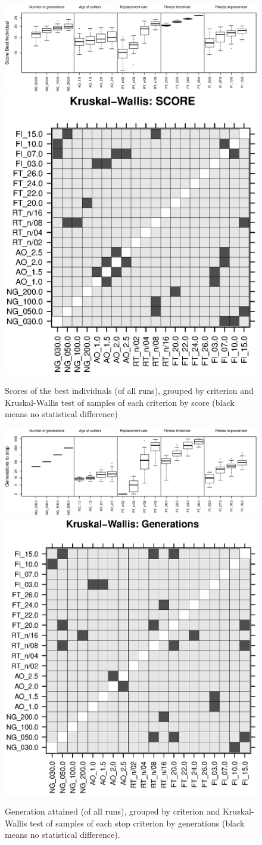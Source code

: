 \documentclass[runningheads,a4paper]{llncs}
\begin{document}
\begin{figure}
\begin{center}
\includegraphics[width=0.74\columnwidth]{imags/Boxplot_SC-Score-log.eps}
\includegraphics[width=0.25\columnwidth]{imags/Kruskal-Score.eps}
\end{center} 
\caption{Scores of the best individuals (of all runs), grouped by criterion and Kruskal-Wallis test of samples of each criterion by score (black means no statistical difference)}
\label{fig:boxplotscore}
\end{figure}

\begin{figure}[h!tb]
\begin{center}
\includegraphics[width=0.74\columnwidth]{imags/Boxplot_SC-Generations-log.eps}
\includegraphics[width=0.25\columnwidth]{imags/Kruskal-Generations.eps}
\end{center} 
\caption{Generation attained (of all runs), grouped by criterion and Kruskal-Wallis test of samples of each stop criterion by generations (black means no statistical difference).}
\label{fig:boxplotgenerations}
\end{figure}
\end{document}
